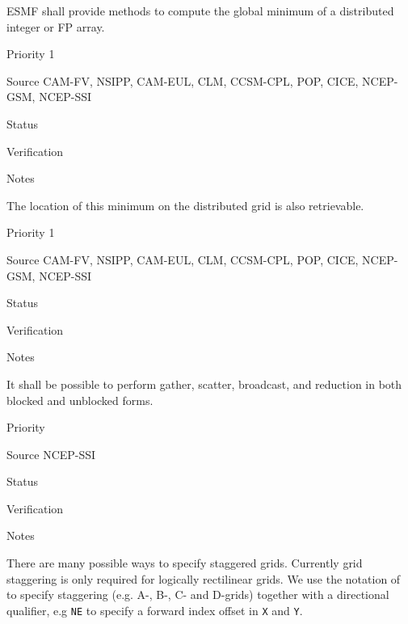 
ESMF shall provide methods to compute the global minimum of a
distributed integer or FP array.

\begin{reqlist}
\item[Priority] 1
\item[Source] CAM-FV, NSIPP, CAM-EUL, CLM, CCSM-CPL, POP, CICE, NCEP-GSM, NCEP-SSI
\item[Status]
\item[Verification]
\item[Notes]
\end{reqlist}



The location of this minimum on the distributed grid is also
retrievable.

\begin{reqlist}
\item[Priority] 1
\item[Source] CAM-FV, NSIPP, CAM-EUL, CLM, CCSM-CPL, POP, CICE, NCEP-GSM, NCEP-SSI
\item[Status]
\item[Verification]
\item[Notes]
\end{reqlist}


It shall be possible to perform gather, scatter, broadcast, and reduction in both blocked and unblocked forms.

\begin{reqlist}
\item[Priority] 
\item[Source] NCEP-SSI
\item[Status]
\item[Verification]
\item[Notes] 
\end{reqlist}


There are many possible ways to specify staggered grids.  Currently
grid staggering is only required for logically rectilinear grids. We
use the notation of \cite{ref:a1966} to specify staggering (e.g. A-,
B-, C- and D-grids) together with a directional qualifier, e.g
\texttt{NE} to specify a forward index offset in \texttt{X} and
\texttt{Y}.

\newcommand{\agrid}{\texttt{AGRID~}}
\newcommand{\bgrid}{\texttt{BGRID~}}
\newcommand{\cgrid}{\texttt{CGRID~}}
\newcommand{\dgrid}{\texttt{DGRID~}}

